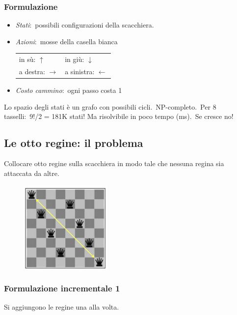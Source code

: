 \subsubsection{Formulazione}
\begin{itemize}
	\item \textit{Stati}:\ possibili configurazioni della scacchiera.
	\item \textit{Azioni}:\ mosse della casella bianca
	      \begin{table}[H]
		      \centering
		      \begin{tabular}{l l}
			      in sù: $\uparrow$       & in giù: $\downarrow$     \\
			      a destra: $\rightarrow$ & a sinistra: $\leftarrow$ \\
		      \end{tabular}
	      \end{table}
	\item \textit{Costo cammino}:\ ogni passo costa 1
\end{itemize}
Lo spazio degli stati è un grafo con possibili cicli.\
NP-completo.\
Per 8 tasselli:\ 9!/2 = 181K stati! Ma risolvibile in poco tempo (ms).\
Se cresce no!

\subsection{Le otto regine: il problema }

Collocare otto regine sulla scacchiera in modo tale che nessuna regina sia attaccata da altre.
\begin{figure}[H]
	\centering
	\includegraphics[width=0.4\textwidth]{immagini/otto_regine.png}
\end{figure}

\subsubsection{Formulazione incrementale 1}
Si aggiungono le regine una alla volta.

